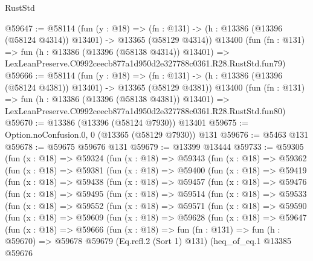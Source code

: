 \begin{lexlean}{RustStd}
\begin{coremodule}
@59647 := @58114
    (fun (y : @18) =>
    (fn : @131) -> (h : @13386 (@13396 (@58124 @4314)) @13401) -> @13365 (@58129 @4314))
    @13400
    (fun (fn : @131) =>
    fun (h : @13386 (@13396 (@58138 @4314)) @13401) =>
    LexLeanPreserve.C0992ceecb877a1d950d2e327788c0361.R28.RustStd.fun79)
@59666 := @58114
    (fun (y : @18) =>
    (fn : @131) -> (h : @13386 (@13396 (@58124 @4381)) @13401) -> @13365 (@58129 @4381))
    @13400
    (fun (fn : @131) =>
    fun (h : @13386 (@13396 (@58138 @4381)) @13401) =>
    LexLeanPreserve.C0992ceecb877a1d950d2e327788c0361.R28.RustStd.fun80)
@59670 := @13386 (@13396 (@58124 @7930)) @13401
@59675 := Option.noConfusion.{0, 0} (@13365 (@58129 @7930)) @131
@59676 := @5463 @131
@59678 := @59675 @59676 @131
@59679 := @13399 @13444
@59733 := @59305
    (fun (x : @18) =>
    @59324
      (fun (x : @18) =>
      @59343
        (fun (x : @18) =>
        @59362
          (fun (x : @18) =>
          @59381
            (fun (x : @18) =>
            @59400
              (fun (x : @18) =>
              @59419
                (fun (x : @18) =>
                @59438
                  (fun (x : @18) =>
                  @59457
                    (fun (x : @18) =>
                    @59476
                      (fun (x : @18) =>
                      @59495
                        (fun (x : @18) =>
                        @59514
                          (fun (x : @18) =>
                          @59533
                            (fun (x : @18) =>
                            @59552
                              (fun (x : @18) =>
                              @59571
                                (fun (x : @18) =>
                                @59590
                                  (fun (x : @18) =>
                                  @59609
                                    (fun (x : @18) =>
                                    @59628
                                      (fun (x : @18) =>
                                      @59647
                                        (fun (x : @18) =>
                                        @59666
                                          (fun (x : @18) =>
                                          fun (fn : @131) =>
                                          fun (h : @59670) =>
                                          @59678
                                            @59679
                                            (Eq.refl.{2} (Sort 1) @131)
                                            (heq_of_eq.{1}
                                              @13385
                                              @59676

\end{coremodule}
\end{lexlean}
